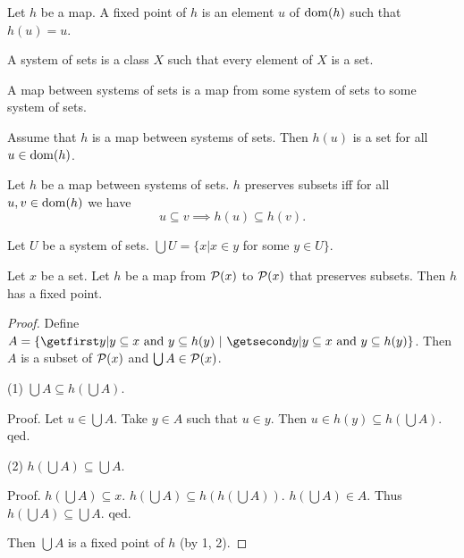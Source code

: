 \documentclass{article}
\begin{document}
  \begin{forthel}
    \begin{definition*}
      Let $h$ be a map.
      A fixed point of $h$ is an element $u$ of $\operatorname{dom}(h)$ such that $h(u) = u$.
    \end{definition*}

 \begin{definition}
      A system of sets is a class $X$ such that every element of $X$ is a set.
    \end{definition}

    \begin{definition*}
      A map between systems of sets is a map from some system of 
sets to some
      system of sets.
    \end{definition*}

\begin{lemma}
Assume that $h$ is a map between systems of sets.
Then $h(u)$ is a set for all $u \in \operatorname{dom}(h)$.
\end{lemma}


    \begin{definition*}
Let $h$ be a map between systems of sets.
      $h$ preserves subsets iff for all $u, v \in \operatorname{dom}(h)$
      we have \[ u \subseteq v \implies h(u) \subseteq h(v). \]
    \end{definition*}

\begin{definition}
Let $U$ be a system of sets.
$\bigcup U = \{x | x \in y$ for some $y \in U\}$.
\end{definition}

    \begin{theorem*}\label{KT}
      Let $x$ be a set.
      Let $h$ be a map from $\mathcal{P}(x)$ to $\mathcal{P}(x)$ that preserves subsets.
      Then $h$ has a fixed point.
    \end{theorem*}
    \begin{proof}
      Define $A = \class{y | \text{$y \subseteq x$ and
      $y \subseteq h(y)$}}$.
      Then $A$ is a subset of $\mathcal{P}(x)$ and
      $\bigcup A \in \mathcal{P}(x)$.
 

(1) $\bigcup A \subseteq h(\bigcup A)$.

Proof.        Let $u \in \bigcup A$.
        Take $y \in A$ such that $u \in y$.
        Then $u \in h(y) \subseteq h(\bigcup A)$.
      qed.

(2) $h(\bigcup A) \subseteq \bigcup A$.

Proof.      $h(\bigcup A) \subseteq x$.
$h(\bigcup A) \subseteq h(h(\bigcup A))$.
$h(\bigcup A) \in A$.
Thus $h(\bigcup A) \subseteq \bigcup A$.
qed.

Then $\bigcup A$ is a fixed point of $h$ (by 1, 2).
    \end{proof}

  \end{forthel}
\end{document}
